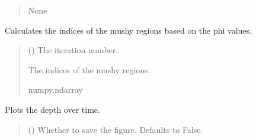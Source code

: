 \documentclass[a4paper,11pt,english,openany]{sphinxmanual}
\begin{document}
\begin{fulllineitems}
\begin{fulllineitems}
\begin{quote}
\begin{description}
\begin{itemize}
\end{itemize}

\sphinxAtStartPar
None

\end{description}\end{quote}

\end{fulllineitems}


\begin{fulllineitems}
\label{\detokenize{api/spyice.postprocess.visualise_model:spyice.postprocess.visualise_model.VisualiseModel.phi_slope}}
\pysigstartsignatures
{}
\pysigstopsignatures
\sphinxAtStartPar
Calculates the indices of the mushy regions based on the phi values.
\begin{quote}\begin{description}
\sphinxAtStartPar
{} () \textendash{} The iteration number.

\sphinxAtStartPar
The indices of the mushy regions.

\sphinxAtStartPar
numpy.ndarray

\end{description}\end{quote}

\end{fulllineitems}


\begin{fulllineitems}
\label{\detokenize{api/spyice.postprocess.visualise_model:spyice.postprocess.visualise_model.VisualiseModel.plot_depth_over_time}}
\pysigstartsignatures
{}
\pysigstopsignatures
\sphinxAtStartPar
Plots the depth over time.
\begin{quote}\begin{description}
\sphinxAtStartPar
{} (\sphinxstyleliteralemphasis{\sphinxupquote{, }}) \textendash{} Whether to save the figure. Defaults to False.


\end{description}
\end{quote}
\end{fulllineitems}
\end{fulllineitems}
\end{document}
